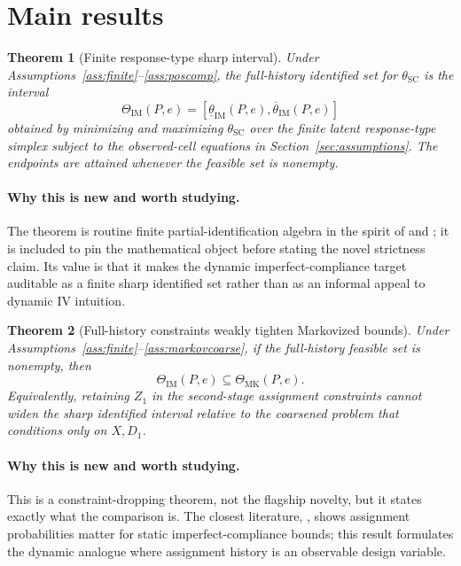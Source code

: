 \documentclass[11pt]{article}
\theoremstyle{definition}
\theoremstyle{plain}
\newtheorem{theorem}{Theorem}
\theoremstyle{remark}
\begin{document}
\section{Main results}
\begin{theorem}[Finite response-type sharp interval]\label{thm:finite-lp}
Under Assumptions~\ref{ass:finite}--\ref{ass:poscomp}, the full-history identified set for \(\theta_{\mathrm{SC}}\) is the interval
\[
\Theta_{\mathrm{IM}}(P,e)=[\underline\theta_{\mathrm{IM}}(P,e),\overline\theta_{\mathrm{IM}}(P,e)]
\]
obtained by minimizing and maximizing \(\theta_{\mathrm{SC}}\) over the finite latent response-type simplex subject to the observed-cell equations in Section~\ref{sec:assumptions}.  The endpoints are attained whenever the feasible set is nonempty.
\end{theorem}
\paragraph{Why this is new and worth studying.}
The theorem is routine finite partial-identification algebra in the spirit of \citet{BalkePearl1997} and \citet{DuarteFinkelsteinKnoxMummoloShpitser2024}; it is included to pin the mathematical object before stating the novel strictness claim.  Its value is that it makes the dynamic imperfect-compliance target auditable as a finite sharp identified set rather than as an informal appeal to dynamic IV intuition.

\begin{theorem}[Full-history constraints weakly tighten Markovized bounds]\label{thm:constraint-containment}
Under Assumptions~\ref{ass:finite}--\ref{ass:markovcoarse}, if the full-history feasible set is nonempty, then
\[
\Theta_{\mathrm{IM}}(P,e)\subseteq \Theta_{\mathrm{MK}}(P,e).
\]
Equivalently, retaining \(Z_1\) in the second-stage assignment constraints cannot widen the sharp identified interval relative to the coarsened problem that conditions only on \(X,D_1\).
\end{theorem}
\paragraph{Why this is new and worth studying.}
This is a constraint-dropping theorem, not the flagship novelty, but it states exactly what the comparison is.  The closest literature, \citet{BugniGaoObradovicVelez2024}, shows assignment probabilities matter for static imperfect-compliance bounds; this result formulates the dynamic analogue where assignment history is an observable design variable.
\end{document}
